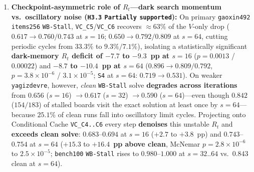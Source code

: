 \documentclass[10pt,letterpaper]{article}
\begin{document}
\begin{enumerate}[topsep=3pt,itemsep=2pt]
  \item \textbf{Checkpoint-asymmetric role of $R_t$—dark search momentum vs.\ oscillatory noise (\texttt{H3.3} \texttt{Partially} \texttt{supported}):} On primary \texttt{gaoxin492} \texttt{items256} \texttt{WB-Stall}, \texttt{VC\_C5}/\texttt{VC\_C6} recovers $\approx 63\%$ of the $V$-only drop ($0.617 \to 0.760/0.743$ at $s=16$; $0.650 \to 0.792/0.809$ at $s=64$, cutting periodic cycles from $33.3\%$ to $9.3\%/7.1\%$), isolating a statistically significant \textbf{dark-memory $R_t$ deficit of $-7.7$ to $-9.3$~pp at $s=16$} ($p=0.0013$ / $0.00022$) and \textbf{$-8.7$ to $-10.4$~pp at $s=64$} ($0.896 \to 0.809/0.792$, $p=3.8\times 10^{-6}$ / $3.1\times 10^{-5}$; \texttt{S4} at $s=64$: $0.719 \to 0.531$). On weaker \texttt{yagizdevre}, however, \emph{clean} \texttt{WB-Stall} solve \textbf{degrades across iterations} from $0.656$ ($s=16$) $\to 0.617$ ($s=32$) $\to \mathbf{0.590}$ ($s=64$)—even though $0.842$ ($154/183$) of stalled boards visit the exact solution at least once by $s=64$—because $25.1\%$ of clean runs fall into oscillatory limit cycles. Projecting onto Conditional Cache \texttt{VC\_C4..C6} every step \textbf{denoises} this unstable $R_t$ and \textbf{exceeds clean solve}: $0.683$--$0.694$ at $s=16$ ($+2.7$ to $+3.8$~pp) and $\mathbf{0.743}$--$\mathbf{0.754}$ at $s=64$ ($\mathbf{+15.3}$ to $\mathbf{+16.4}$~\textbf{pp above clean}, McNemar $p=2.8\times 10^{-6}$ to $2.5\times 10^{-5}$; \texttt{bench100} \texttt{WB-Stall} rises to $0.980$--$1.000$ at $s=32..64$ vs.\ $0.843$ clean at $s=64$).
\end{enumerate}
\end{document}
